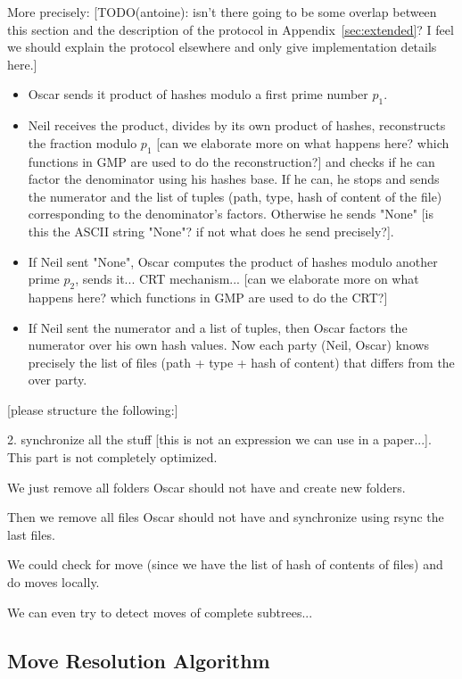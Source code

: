 \documentclass[11pt]{llncs}
\begin{document}
More precisely:
[TODO(antoine): isn't there going to be some overlap between this section and the description of the protocol in Appendix~\ref{sec:extended}? I feel we should explain the protocol elsewhere and only give implementation details here.]
\begin{itemize}
\item Oscar sends it product of hashes modulo a first prime number $p_1$.
\item Neil receives the product, divides by its own product of hashes, reconstructs the fraction modulo $p_1$ [can we elaborate more on what happens here? which functions in GMP are used to do the reconstruction?] and checks if he can factor the denominator using his hashes base. If he can, he stops and sends the numerator and the list of tuples (path, type, hash of content of the file) corresponding to the denominator's factors. Otherwise he sends "None" [is this the ASCII string "None"? if not what does he send precisely?].
\item If Neil sent "None", Oscar computes the product of hashes modulo another prime $p_2$, sends it... CRT mechanism... [can we elaborate more on what happens here? which functions in GMP are used to do the CRT?]
\item If Neil sent the numerator and a list of tuples, then Oscar factors the numerator over his own hash values. Now each party (Neil, Oscar) knows precisely the list of files (path + type + hash of content) that differs from the over party.
\end{itemize}

[please structure the following:]\smallskip

2. synchronize all the stuff [this is not an expression we can use in a paper...]. This part is not completely optimized.\smallskip

We just remove all folders Oscar should not have and create new folders.\smallskip

Then we remove all files Oscar should not have and synchronize using rsync the last files.\smallskip

We could check for move (since we have the list of hash of contents of files) and do moves locally.\smallskip

We can even try to detect moves of complete subtrees...\smallskip

\subsection{Move Resolution Algorithm}
\end{document}
